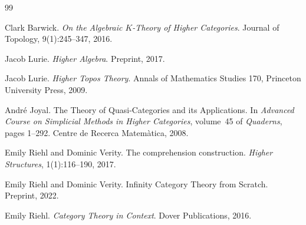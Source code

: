 \documentclass[11pt]{article}
\theoremstyle{definition}
\begin{document}
\begin{thebibliography}{99}

Clark Barwick.
\newblock \emph{On the Algebraic $K$-Theory of Higher Categories}.
\newblock Journal of Topology, 9(1):245--347, 2016.

Jacob Lurie.
\newblock \emph{Higher Algebra}.
\newblock Preprint, 2017.

Jacob Lurie.
\newblock \emph{Higher Topos Theory}.
\newblock Annals of Mathematics Studies 170, Princeton University Press, 2009.

Andr\'e Joyal.
\newblock The Theory of Quasi-Categories and its Applications.
\newblock In \emph{Advanced Course on Simplicial Methods in Higher Categories},
  volume~45 of \emph{Quaderns}, pages 1--292. Centre de Recerca Matem\`atica,
  2008.

Emily Riehl and Dominic Verity.
\newblock The comprehension construction.
\newblock \emph{Higher Structures}, 1(1):116--190, 2017.

Emily Riehl and Dominic Verity.
\newblock Infinity Category Theory from Scratch.
\newblock Preprint, 2022.

Emily Riehl.
\newblock \emph{Category Theory in Context}.
\newblock Dover Publications, 2016.

\end{thebibliography}
\end{document}
